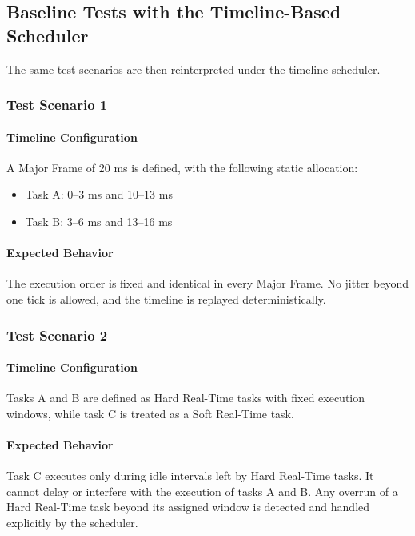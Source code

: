 \documentclass[12pt,english, makeidx, a4paper, titlepage,oneside]{article}
\begin{document}
\subsection{Baseline Tests with the Timeline-Based Scheduler}

The same test scenarios are then reinterpreted under the timeline scheduler.

\subsubsection{Test Scenario 1}

\paragraph{Timeline Configuration}
A Major Frame of 20 ms is defined, with the following static allocation:
\begin{itemize}
    \item Task A: 0--3 ms and 10--13 ms
    \item Task B: 3--6 ms and 13--16 ms
\end{itemize}

\paragraph{Expected Behavior}
The execution order is fixed and identical in every Major Frame. No jitter beyond one tick is allowed, and the timeline is replayed deterministically.

\subsubsection{Test Scenario 2}

\paragraph{Timeline Configuration}
Tasks A and B are defined as Hard Real-Time tasks with fixed execution windows, while task C is treated as a Soft Real-Time task.

\paragraph{Expected Behavior}
Task C executes only during idle intervals left by Hard Real-Time tasks. It cannot delay or interfere with the execution of tasks A and B. Any overrun of a Hard Real-Time task beyond its assigned window is detected and handled explicitly by the scheduler.
\end{document}
